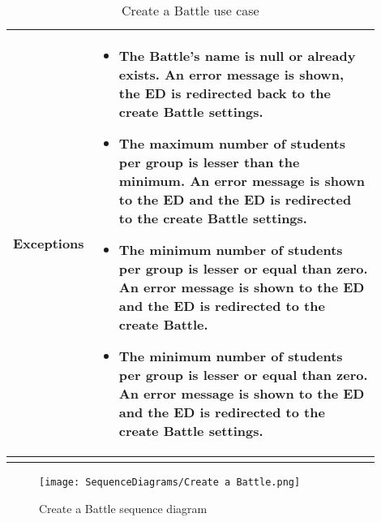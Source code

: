 \begin{center}
\begin{longtable}{|l|p{0.9\linewidth}|}
        \hline
        \textbf{Exceptions}        & \begin{itemize}
                \item The Battle’s name is null or already exists. An error message is shown, the ED is redirected back to the create Battle settings.
                \item The maximum number of students per group is lesser than the minimum.  An error message is shown to the ED and the ED is redirected to the create Battle settings.
                \item The minimum number of students per group is lesser or equal than zero.  An error message is shown to the ED and the ED is redirected to the create Battle.
                \item The minimum number of students per group is lesser or equal than zero.  An error message is shown to the ED and the ED is redirected to the create Battle settings.    
        \end{itemize}    \\
        \hline
        \caption{Create a Battle use case}
        \label{tab: create_a_Battle_use_case}
    \end{longtable}
\end{center}

\begin{figure}[H]
    \begin{center}
        \texttt{[image: SequenceDiagrams/Create a Battle.png]}
        \caption{Create a Battle sequence diagram}
        \label{fig:create_a_battle_seqd}%
    \end{center}
\end{figure}

